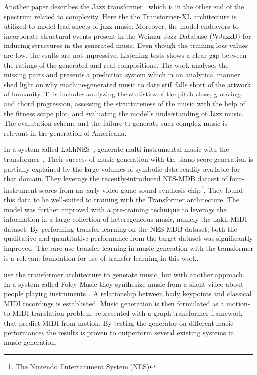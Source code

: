 \documentclass{IEEEtran}
\begin{document}
Another paper describes the Jazz transformer~\cite{wu2020jazz} which is in
the other end of the spectrum related to complexity. Here the the
Transformer-XL architecture is utilized to model lead sheets of jazz music.
Moreover, the model endeavors to incorporate structural events present in the
Weimar Jazz Database (WJazzD) for inducing structures in the generated music.
Even though the training loss values are low, the esults are not impressive.
Listening tests shows a clear gap between the ratings of the generated and
real compositions. The work analyses the missing parts and presents a
prediction system which in an analytical manner shed light on why
machine-generated music to date still falls short of the artwork of humanity.
This includes analyzing the statistics of the pitch class, grooving, and
chord progression, assessing the structureness of the music with the help of
the fitness scape plot, and evaluating the model’s understanding of Jazz
music. The evalutation scheme and the failure to generate such complex music
is relevant in the generation of Americana.

In a system called LakhNES~\citeauthor{donahue2019lakhnes}, generate
multi-instrumental music with the transformer~\cite{donahue2019lakhnes}.
Their success of music generation with the piano score generation is
partially explained by the large volumes of symbolic data readily available
for that domain. They leverage the recently-introduced NES-MDB dataset of
four-instrument scores from an early video game sound synthesis
chip\footnote{The Nintendo Entertainment System (NES)}. They found this data
to be well-suited to training with the Transformer architecture. The model
was further improved with a pre-training technique to leverage the
information in a large collection of heterogeneous music, namely the Lakh
MIDI dataset. By performing transfer learning on the NES-MDB dataset, both
the qualitative and quantitative performance from the target dataset was
significantly improved. The rare use transfer learning in music generation
with the transformer is a relevant foundation for use of transfer learning in
this work.

\citeauthor{gan2020foley} use the transformer architecture to generate music,
but with another approach. In a system called Foley Music they synthesize
music from a silent video about people playing
instruments~\cite{gan2020foley}. A relationship between body keypoints and
classical MIDI recordings is established. Music generation is then formulated
as a motion-to-MIDI translation problem, represented with a graph transformer
framework that predict MIDI from motion. By testing the generator on
different music performances the results is proven to outperform several
existing systems in music generation.
\end{document}
